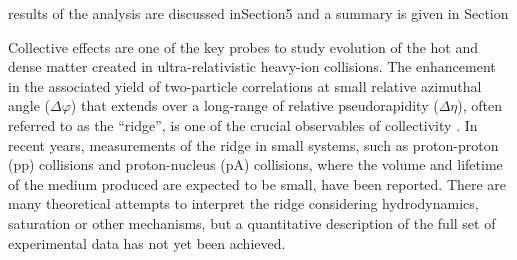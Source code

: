 \documentclass[ALICE,manyauthors]{cernphprep}
\begin{document}
results of the analysis are discussed inSection5 and a summary is given in Section


Collective effects are one of the key probes to study evolution of the hot and dense matter created in ultra-relativistic heavy-ion collisions. The enhancement in the associated yield of two-particle correlations at small relative azimuthal angle ($\Delta\varphi$) that extends over a long-range of relative pseudorapidity ($\Delta\eta$), often referred to as the “ridge”,  is one of the crucial observables of collectivity \cite{ridge_aa_1, ridge_aa_2}. In recent years, measurements of the ridge in small systems, such as proton-proton (pp) collisions and proton-nucleus (pA) collisions, where the volume and lifetime of the medium produced are expected to be small, have been reported\cite{ridge_pp_1, ridge_pp_2, ridge_pp_3, ridge_pp_4}. There are many theoretical attempts\cite{ridge_theory_1, ridge_theory_2, ridge_theory_3, ridge_theory_4} to interpret the ridge considering hydrodynamics, saturation or other mechanisms, but a quantitative description of the full set of experimental data has not yet been achieved.




\end{document}

